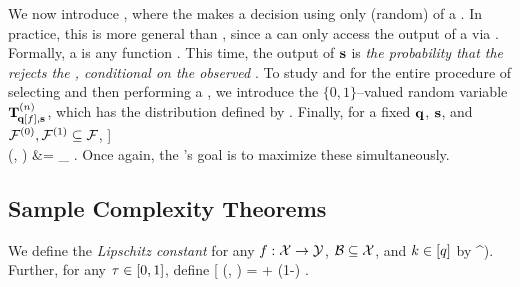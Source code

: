 %
We now introduce \emph{\samphyptestnaming{}}, where the \pracname{} makes a decision using only (random) \querynames{} of a \fielddefname{}. In practice, this is more general than \oraclehyptestnaming{}, since a \pracname{} can only access the output of a \fielddefname{} via \querynames{}.
Formally, a \samphyptestname{} is any function
\*[
    \samphyptest: \subspaceset{\queryspace} \to [0,1].
\]
This time, the output of $\mathbf{s}$ is \emph{the probability that the \pracname{} rejects the \nullname{}, conditional on the observed \querynames{}}. To study \specname{} and \sensname{} for the entire procedure of selecting \querynames{} and then performing a \samphyptestname{}, we introduce the $\{0,1\}$--valued random variable $\mathbf{T}_{\! \mathbf{q}[f],\mathbf{s}}^{(n)}$, 
%
which has the distribution defined by
\*[
    \samphyprv{\queryalgo[\model]}{\samphyptest}{n}
    \Bigcondsym \covobs\timeind{1:n}
    &\sim \bernoullidist\Big(\samphyptest\Big(\covobs\timeind{1:n}, \model(\covobs\timeind{1:n}),
    \grad\model(\covobs\timeind{1:n})\Big)\Big) \\
    \covobs\timeind{1:n} &\sim \queryalgo\timeind{1:n}[\model].
\]
%
Finally,
for a fixed
$\mathbf{q}$, $\mathbf{s}$, and $\mathcal{F}^{(0)},\mathcal{F}^{(1)} \subseteq \mathcal{F}$, 
\*[
    \sampspecsym\timeind{n}(\queryalgo, \samphyptest) &= 
    \inf_{\model\in\modelspace\nullind}
    \Big[1-\EE\Big[\samphyprv{\queryalgo[\model]}{\samphyptest}{n}\Big] \Big] \  \\
    \sampsenssym{}(\queryalgo, \samphyptest) &=
    \inf_{\model\in\modelspace\altind}
    \EE{}.
\]
Once again, the \pracname{}'s goal is to maximize these simultaneously.

\subsection{Sample Complexity Theorems}

%

We define the \emph{Lipschitz constant} for any $f:\mathcal{X}\to\mathcal{Y}$, $\mathcal{B} \subseteq \mathcal{X}$, and $k\in[q]$ by
\*[
    \lipdef\lipind{\covnbhd}(\model)\feat{k}
    = \sup_{\covval,\covvaldum\in\covnbhd} \frac{\abs{\model(\covval)\feat{k} - \model(\covvaldum)\feat{k}}}{\norm{\covval-\covvaldum}_\infty}.
\]

First, we show that the task shown to be impossible for \oraclehyptestnames{} in \cref{fact:oracle-hypothesis-spurious-multivariate} can be solved with sufficiently many \querynames{}.
For any $\inscale>0$, let $\queryalgo\feat{\inscale}$ be such that 
\*[
    \queryalgo\timeind{t}\feat{\inscale} \equiv \uniformdist\Big((0,\inscale]^\covdim\Big).
\]
Further, for any $\tau\in[0,1]$, define 
\*[
    \samphyptestoracle\feat{\covprob}(\covval{}, \dataval{})
    = \covprob + (1-\covprob) \cdot {}.
\]

